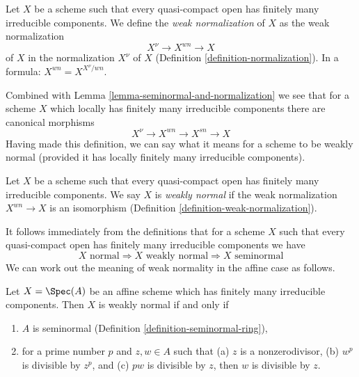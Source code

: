 \begin{definition}
\label{definition-weak-normalization}
Let $X$ be a scheme such that every quasi-compact open has
finitely many irreducible components. We define the
{\it weak normalization} of $X$ as the weak normalization
$$
X^\nu \longrightarrow X^{wn} \longrightarrow X
$$
of $X$ in the normalization $X^\nu$ of $X$
(Definition \ref{definition-normalization}).
In a formula: $X^{wn} = X^{X^\nu/wn}$.
\end{definition}

\noindent
Combined with Lemma \ref{lemma-seminormal-and-normalization} we see that
for a scheme $X$ which locally has finitely many irreducible components
there are canonical morphisms
$$
X^\nu \to X^{wn} \to X^{sn} \to X
$$
Having made this definition, we can say what it means for a scheme
to be weakly normal (provided it has locally finitely many irreducible
components).

\begin{definition}
\label{definition-weakly-normal}
Let $X$ be a scheme such that every quasi-compact open has
finitely many irreducible components. We say $X$ is {\it weakly normal}
if the weak normalization $X^{wn} \to X$ is an isomorphism
(Definition \ref{definition-weak-normalization}).
\end{definition}

\noindent
It follows immediately from the definitions that for a scheme $X$ such
that every quasi-compact open has finitely many irreducible components
we have
$$
X\text{ normal} \Rightarrow
X\text{ weakly normal} \Rightarrow
X\text{ seminormal}
$$
We can work out the meaning of weak normality in the affine case as follows.

\begin{lemma}
\label{lemma-affine-weakly-normal}
Let $X = \Spec(A)$ be an affine scheme which has finitely many
irreducible components. Then $X$ is weakly normal if and only if
\begin{enumerate}
\item $A$ is seminormal (Definition \ref{definition-seminormal-ring}),
\item for a prime number $p$ and $z, w \in A$ such that
(a) $z$ is a nonzerodivisor, (b) $w^p$ is divisible by $z^p$, and
(c) $pw$ is divisible by $z$, then $w$ is divisible by $z$.
\end{enumerate}
\end{lemma}

